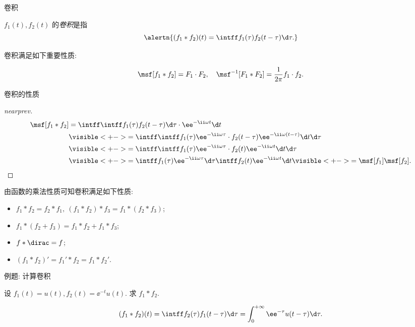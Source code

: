 \begin{frame}{卷积}
	\onslide<+->
	\begin{definition}
		$f_1(t),f_2(t)$ 的\emph{卷积}是指
	\[
		\alertn{(f_1\ast f_2)(t)=\intff  f_1(\tau)f_2(t-\tau)\d \tau.}
	\]
	\end{definition}
	\onslide<+->
	卷积满足如下重要性质:
	\onslide<+->
	\begin{theorem*}[][卷积定理]
	\[
		\msf[f_1\ast f_2]=F_1\cdot F_2,\quad
	\msf^{-1}[F_1\ast F_2]=\frac1{2\pi}f_1\cdot f_2.
	\]
	\bigdel
	\end{theorem*}
\end{frame}


\begin{frame}{卷积的性质}\small
	\onslide<+->
	\begin{proof}[nearprev]
		\bigdel
		\begin{align*}
			\msf[f_1\ast f_2]&=\intff \intff f_1(\tau)f_2(t-\tau)\d \tau \cdot \ee^{-\ii \omega t}\d t\\
			&\visible<+->{=\intff \intff f_1(\tau)\ee^{-\ii \omega \tau}\cdot f_2(t-\tau)\ee^{-\ii \omega (t-\tau)}\d t\d \tau}\\
			&\visible<+->{=\intff \intff f_1(\tau)\ee^{-\ii \omega \tau}\cdot f_2(t)\ee^{-\ii \omega t}\d t\d \tau}\\
			&\visible<+->{=\intff f_1(\tau)\ee^{-\ii \omega \tau}\d\tau\intff f_2(t)\ee^{-\ii \omega t}\d t}\visible<+->{=\msf[f_1]\msf[f_2].\qedhere}
		\end{align*}
	\end{proof}
	\onslide<+->
	由函数的乘法性质可知卷积满足如下性质:
	\begin{itemize}\bf
		\item $f_1\ast f_2=f_2\ast f_1,\ (f_1\ast f_2)\ast f_3=f_1\ast(f_2\ast f_3)$;
		\item $f_1\ast(f_2+f_3)=f_1\ast f_2+f_1\ast f_3$;
		\item $f\ast\dirac=f$;
		\item $(f_1\ast f_2)'=f_1'\ast f_2=f_1\ast f_2'$.
	\end{itemize}
\end{frame}


\begin{frame}{例题: 计算卷积}
	\onslide<+->
	\begin{example}[nearnext]
		设 $f_1(t)=u(t),f_2(t)=\ee^{-t}u(t)$. 求 $f_1\ast f_2$.
	\end{example}
	\onslide<+->
	\begin{solution}[nearprev]
			\[
		(f_1\ast f_2)(t)=\intff  f_2(\tau)f_1(t-\tau)\d \tau=\int_0^{+\infty} \ee^{-\tau}u(t-\tau)\d \tau.
	\]
		\onslide<+->{故 $(f_1\ast f_2)(t)=(1-\ee^{-t})u(t)$.
		}
	\end{solution}
\end{frame}


